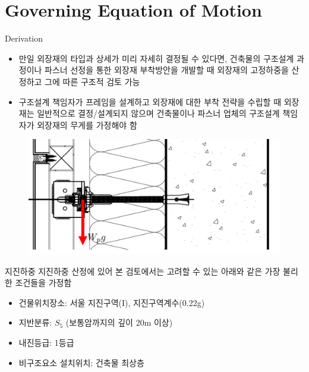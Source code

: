 \documentclass[9pt]{beamer}
\begin{document}
\section{Governing Equation of Motion}
	\begin{frame}{Derivation}
	\begin{itemize}
		\item 만일 외장재의 타입과 상세가 미리 자세히 결정될 수 있다면, 건축물의 구조설계 과정이나 파스너 선정을 통한 외장재 부착방안을 개발할 때 외장재의 고정하중을 산정하고 그에 따른 구조적 검토 가능
		\item 구조설계 책임자가 프레임을 설계하고 외장재에 대한 부착 전략을 수립할 때 외장재는 일반적으로 결정/설계되지 않으며 건축물이나 파스너 업체의 구조설계 책임자가 외장재의 무게를 가정해야 함 
	\end{itemize}
\begin{figure}
\includegraphics[height=.40\textheight]{image05}
\end{figure}
	\end{frame}
	\begin{frame}{지진하중}
	지진하중 산정에 있어 본 검토에서는 고려할 수 있는 아래와 같은 가장 불리한 조건들을 가정함

\begin{itemize}
	\item 건물위치장소: 서울 지진구역(I), 지진구역계수(0.22g)
	\item 지반분류:  $S_5$ (보통암까지의 깊이 20m 이상)
	\item 내진등급: 1등급
	\item 비구조요소 설치위치: 건축물 최상층
\end{itemize}
	\end{frame}
\end{document}
